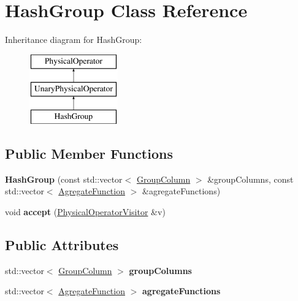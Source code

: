 \hypertarget{class_hash_group}{\section{Hash\+Group Class Reference}
\label{class_hash_group}
}
Inheritance diagram for Hash\+Group\+:\begin{figure}[H]
\begin{center}
\leavevmode
\includegraphics[height=3.000000cm]{class_hash_group}
\end{center}
\end{figure}
\subsection*{Public Member Functions}
\begin{DoxyCompactItemize}
\item 
\hypertarget{class_hash_group_af175f06e72f0fd7476e652ec5ffcbeb7}{{\bfseries Hash\+Group} (const std\+::vector$<$ \hyperlink{class_group_column}{Group\+Column} $>$ \&group\+Columns, const std\+::vector$<$ \hyperlink{class_agregate_function}{Agregate\+Function} $>$ \&agregate\+Functions)}\label{class_hash_group_af175f06e72f0fd7476e652ec5ffcbeb7}

\item 
\hypertarget{class_hash_group_a300c7ad6b7a4e39c9a7dc5a57389b85f}{void {\bfseries accept} (\hyperlink{class_physical_operator_visitor}{Physical\+Operator\+Visitor} \&v)}\label{class_hash_group_a300c7ad6b7a4e39c9a7dc5a57389b85f}

\end{DoxyCompactItemize}
\subsection*{Public Attributes}
\begin{DoxyCompactItemize}
\item 
\hypertarget{class_hash_group_a61af9515cad55af148210493431c5df6}{std\+::vector$<$ \hyperlink{class_group_column}{Group\+Column} $>$ {\bfseries group\+Columns}}\label{class_hash_group_a61af9515cad55af148210493431c5df6}

\item 
\hypertarget{class_hash_group_a8a813f6713413f2bd401bfa77be774de}{std\+::vector$<$ \hyperlink{class_agregate_function}{Agregate\+Function} $>$ {\bfseries agregate\+Functions}}\label{class_hash_group_a8a813f6713413f2bd401bfa77be774de}

\end{DoxyCompactItemize}


